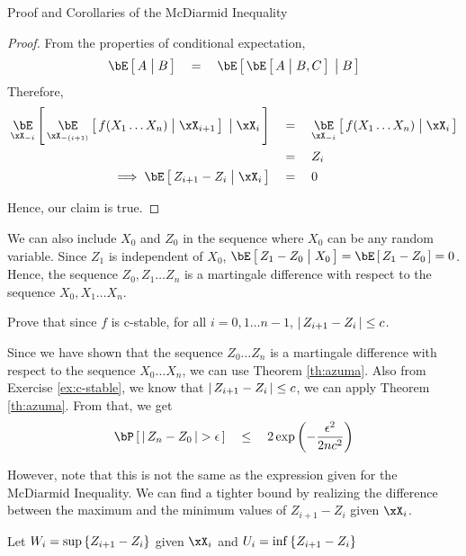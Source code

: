 \documentclass{article}
\begin{document}
\begin{ssection}{Proof and Corollaries of the McDiarmid Inequality}
\begin{proof}
		From the properties of conditional expectation,
		\begin{align*}
			\E{A \pipe B}	\eq \E{\E{A \pipe B, C} \pipe B} 
		\end{align*}
		Therefore,
		\begin{align*}
			\E[\xX_{-i}]{\E[\xX_{-(i + 1)}]{f(X_1 \dots X_n) \pipe \xX_{i + 1}} \pipe \xX_i} & \eq	\E[\xX_{-i}]{f(X_1 \dots X_n) \pipe \xX_i} \\
			                                                                                 & \eq	Z_i                                        \\
			\implies	\E{Z_{i + 1} - Z_i \pipe \xX_i}                                         & \eq	0                                          
		\end{align*}
		
		Hence, our claim is true.
	\end{proof}
	
	\begin{remark}
		We can also include $X_0$ and $Z_0$ in the sequence where $X_0$ can be any random variable. Since $Z_1$ is independent of $X_0$, $\E{Z_1 - Z_0 \pipe X_0} = \E{Z_1 - Z_0} = 0$. Hence, the sequence $Z_0, Z_1 \dots Z_n$ is a martingale difference with respect to the sequence $X_0, X_1 \dots X_n$.
	\end{remark} \br
	
	\begin{exercise}
		Prove that since $f$ is c-stable, for all $i = 0, 1 \dots n - 1$, $\left| \,{Z_{i + 1} - Z_i}\, \right| \le c$.
		\label{ex:c-stable}
	\end{exercise}
	
	Since we have shown that the sequence $Z_0 \dots Z_n$ is a martingale difference with respect to the sequence $X_0 \dots X_n$, we can use Theorem \ref{th:azuma}. Also from Exercise \ref{ex:c-stable}, we know that $\left| \,{Z_{i + 1} - Z_i}\, \right| \le c$, we can apply Theorem \ref{th:azuma}. From that, we get
	\begin{align*}
		\prob{\abs{Z_n - Z_0} > \epsilon}	\qle	2 \texp{- \frac{\epsilon^2}{2 n c^2}} 
	\end{align*}
	
	However, note that this is not the same as the expression given for the McDiarmid Inequality. We can find a tighter bound by realizing the difference between the maximum and the minimum values of $Z_{i + 1} - Z_{i}$ given $\xX_{i}$.
	
	Let $W_i = \sup \left\{ {Z_{i + 1} - Z_i} \right\}$ given $\xX_i$ and $U_i = \inf \left\{ {Z_{i + 1} - Z_i} \right\}$
	

\end{ssection}
\end{document}
